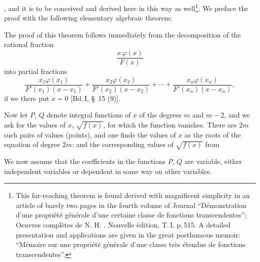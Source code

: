 , and it is to be conceived and derived here in this way as well\footnote{This far-reaching theorem is found derived with magnificent simplicity in an article of barely two pages in the fourth volume of  Journal ``D\'emonstration d'une propri\'et\'e g\'en\'erale d'une certaine classe de fonctions transcendentes''; Oeuvres compl\`etes de N. H. . Nouvelle \'edition, T.\,I, p.\,515. A detailed presentation and applications are given in the great posthumous memoir: ``M\'emoire sur une propri\'et\'e g\'en\'erale d'une classe tr\`es \'etendue de fonctions transcendentes''.}. We preface the proof with the following elementary algebraic theorem:


The proof of this theorem follows immediately from the decomposition of the rational fraction
\[
\frac{x\,\varphi(x)}{F(x)}
\]
into partial fractions
\[
\frac{x_1\varphi(x_1)}{F'(x_1)(x-x_1)} + \frac{x_2\varphi(x_2)}{F'(x_2)(x-x_2)} + \cdots + \frac{x_n\varphi(x_n)}{F'(x_n)(x-x_n)},
\]
if we there put $x = 0$ [Bd.\,I, \S\ 15 (9)].

Now let $P$, $Q$ denote integral functions of $x$ of the degrees $m$ and $m-2$, and we ask for the values of $x$, $\sqrt{f(x)}$, for which the function
vanishes. There are $2m$ such pairs of values (points), and one finds the values of $x$ as the roots of the equation of degree $2m$:
and the corresponding values of $\sqrt{f(x)}$ from

We now assume that the coefficients in the functions $P$, $Q$ are variable, either independent variables or dependent in some way on other variables.
